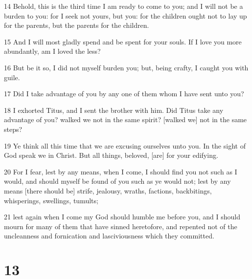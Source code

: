 \par 14 Behold, this is the third time I am ready to come to you; and I will not be a burden to you: for I seek not yours, but you: for the children ought not to lay up for the parents, but the parents for the children.
\par 15 And I will most gladly spend and be spent for your souls. If I love you more abundantly, am I loved the less?
\par 16 But be it so, I did not myself burden you; but, being crafty, I caught you with guile.
\par 17 Did I take advantage of you by any one of them whom I have sent unto you?
\par 18 I exhorted Titus, and I sent the brother with him. Did Titus take any advantage of you? walked we not in the same spirit? [walked we] not in the same steps?
\par 19 Ye think all this time that we are excusing ourselves unto you. In the sight of God speak we in Christ. But all things, beloved, [are] for your edifying.
\par 20 For I fear, lest by any means, when I come, I should find you not such as I would, and should myself be found of you such as ye would not; lest by any means [there should be] strife, jealousy, wraths, factions, backbitings, whisperings, swellings, tumults;
\par 21 lest again when I come my God should humble me before you, and I should mourn for many of them that have sinned heretofore, and repented not of the uncleanness and fornication and lasciviousness which they committed.

\chapter{13}

